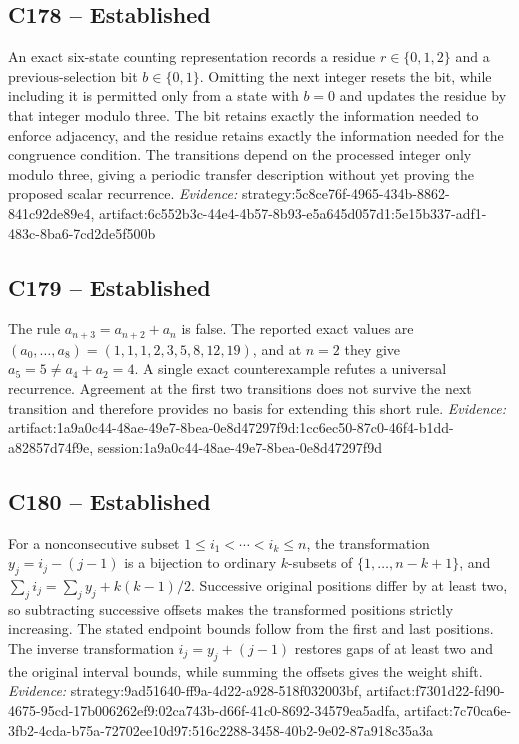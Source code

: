 \documentclass[11pt]{article}
\begin{document}
\subsection{C178 -- Established}
An exact six-state counting representation records a residue $r\in\{0,1,2\}$ and a previous-selection bit $b\in\{0,1\}$. Omitting the next integer resets the bit, while including it is permitted only from a state with $b=0$ and updates the residue by that integer modulo three.
The bit retains exactly the information needed to enforce adjacency, and the residue retains exactly the information needed for the congruence condition. The transitions depend on the processed integer only modulo three, giving a periodic transfer description without yet proving the proposed scalar recurrence.
\textit{Evidence: }strategy:5c8ce76f-4965-434b-8862-841c92de89e4, artifact:6c552b3c-44e4-4b57-8b93-e5a645d057d1:5e15b337-adf1-483c-8ba6-7cd2de5f500b
\subsection{C179 -- Established}
The rule $a_{n+3}=a_{n+2}+a_n$ is false. The reported exact values are $(a_0,\ldots,a_8)=(1,1,1,2,3,5,8,12,19)$, and at $n=2$ they give $a_5=5\neq a_4+a_2=4$.
A single exact counterexample refutes a universal recurrence. Agreement at the first two transitions does not survive the next transition and therefore provides no basis for extending this short rule.
\textit{Evidence: }artifact:1a9a0c44-48ae-49e7-8bea-0e8d47297f9d:1cc6ec50-87c0-46f4-b1dd-a82857d74f9e, session:1a9a0c44-48ae-49e7-8bea-0e8d47297f9d
\subsection{C180 -- Established}
For a nonconsecutive subset $1\leq i_1<\cdots<i_k\leq n$, the transformation $y_j=i_j-(j-1)$ is a bijection to ordinary $k$-subsets of $\{1,\ldots,n-k+1\}$, and $\sum_j i_j=\sum_j y_j+k(k-1)/2$.
Successive original positions differ by at least two, so subtracting successive offsets makes the transformed positions strictly increasing. The stated endpoint bounds follow from the first and last positions. The inverse transformation $i_j=y_j+(j-1)$ restores gaps of at least two and the original interval bounds, while summing the offsets gives the weight shift.
\textit{Evidence: }strategy:9ad51640-ff9a-4d22-a928-518f032003bf, artifact:f7301d22-fd90-4675-95cd-17b006262ef9:02ca743b-d66f-41c0-8692-34579ea5adfa, artifact:7c70ca6e-3fb2-4cda-b75a-72702ee10d97:516c2288-3458-40b2-9e02-87a918c35a3a
\end{document}
